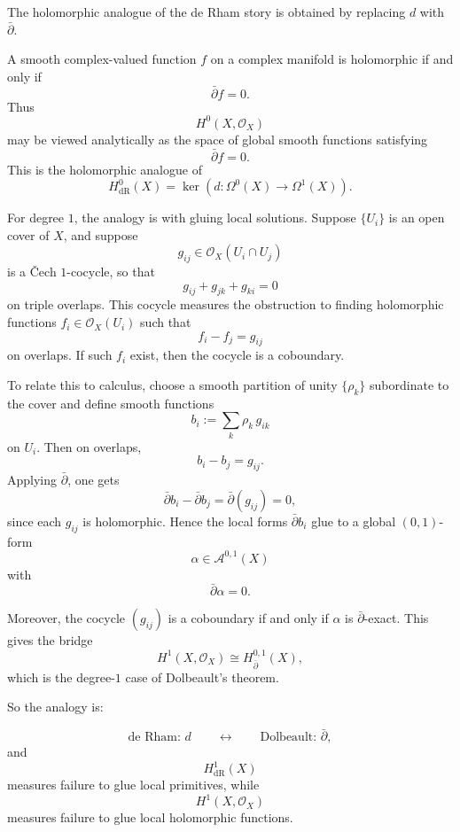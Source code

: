 \documentclass[11pt,openany]{article}
\begin{document}
The holomorphic analogue of the de Rham story is obtained by replacing $d$ with $\bar\partial$.

A smooth complex-valued function $f$ on a complex manifold is holomorphic if and only if
\[
\bar\partial f=0.
\]
Thus
\[
H^0(X,\mathcal O_X)
\]
may be viewed analytically as the space of global smooth functions satisfying
\[
\bar\partial f=0.
\]
This is the holomorphic analogue of
\[
H^0_{\mathrm{dR}}(X)=\ker(d:\Omega^0(X)\to\Omega^1(X)).
\]

For degree $1$, the analogy is with gluing local solutions. Suppose $\{U_i\}$ is an open cover of $X$, and suppose
\[
g_{ij}\in \mathcal O_X(U_i\cap U_j)
\]
is a \v{C}ech $1$-cocycle, so that
\[
g_{ij}+g_{jk}+g_{ki}=0
\]
on triple overlaps. This cocycle measures the obstruction to finding holomorphic functions $f_i\in \mathcal O_X(U_i)$ such that
\[
f_i-f_j=g_{ij}
\]
on overlaps. If such $f_i$ exist, then the cocycle is a coboundary.

To relate this to calculus, choose a smooth partition of unity $\{\rho_k\}$ subordinate to the cover and define smooth functions
\[
b_i:=\sum_k \rho_k\, g_{ik}
\]
on $U_i$. Then on overlaps,
\[
b_i-b_j=g_{ij}.
\]
Applying $\bar\partial$, one gets
\[
\bar\partial b_i-\bar\partial b_j=\bar\partial(g_{ij})=0,
\]
since each $g_{ij}$ is holomorphic. Hence the local forms $\bar\partial b_i$ glue to a global $(0,1)$-form
\[
\alpha\in \mathcal A^{0,1}(X)
\]
with
\[
\bar\partial\alpha=0.
\]

Moreover, the cocycle $(g_{ij})$ is a coboundary if and only if $\alpha$ is $\bar\partial$-exact. This gives the bridge
\[
H^1(X,\mathcal O_X)\cong H^{0,1}_{\bar\partial}(X),
\]
which is the degree-$1$ case of Dolbeault's theorem.

So the analogy is:

\[
\text{de Rham: } d \qquad\leftrightarrow\qquad \text{Dolbeault: } \bar\partial,
\]
and
\[
H^1_{\mathrm{dR}}(X)
\]
measures failure to glue local primitives, while
\[
H^1(X,\mathcal O_X)
\]
measures failure to glue local holomorphic functions.
\end{document}
